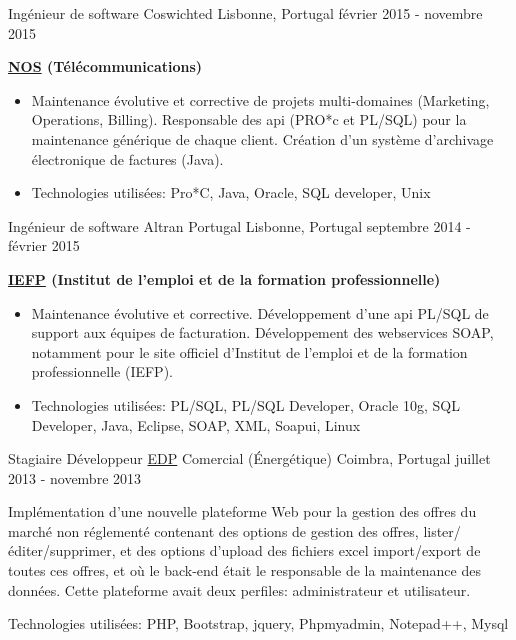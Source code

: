 \begin{cventries}

\cventry
{Ingénieur de software} %
{Coswichted} %
{Lisbonne, Portugal} %
{février 2015 - novembre 2015} %
{ %
\begin{cvitems}
\item { \textbf{\href{https://www.nos.pt/}{NOS} (Télécommunications)}}
\begin{itemize}
\item {Maintenance évolutive et corrective de projets multi-domaines (Marketing, Operations, Billing). 
Responsable des api (PRO*c et PL/SQL) pour la maintenance générique de chaque client. Création d’un système d’archivage électronique de factures (Java).}
\item {Technologies utilisées: Pro*C, Java, Oracle, SQL developer, Unix}
\end{itemize}
\end{cvitems}
}


\cventry
{Ingénieur de software} %
{Altran Portugal} %
{Lisbonne, Portugal} %
{septembre 2014 - février 2015} %
{ %
\begin{cvitems}
\item { \textbf{\href{https://www.iefp.pt/}{IEFP} (Institut de l'emploi et de la formation professionnelle)}}
\begin{itemize}
\item {Maintenance évolutive et corrective. Développement d’une api PL/SQL de support aux équipes de facturation. Développement des webservices SOAP, notamment pour le site officiel d’Institut de l'emploi et de la formation professionnelle (IEFP).}
\item{Technologies utilisées: PL/SQL, PL/SQL Developer, Oracle 10g, SQL Developer, Java, Eclipse, SOAP, XML, Soapui, Linux}
\end{itemize}
\end{cvitems} 
}


\cventry
{Stagiaire Développeur} %
{\href{http://www.edp.pt/pt/Pages/homepage.aspx}{EDP} Comercial (Énergétique)} %
{Coimbra, Portugal} %
{juillet 2013 - novembre 2013} %
{ %
\begin{cvitems}
\item {Implémentation d’une nouvelle plateforme Web pour la gestion des offres du marché non réglementé contenant des options de gestion des offres, lister/éditer/supprimer, et des options d’upload des fichiers excel import/export de toutes ces offres, et où le back-end  était le responsable de la maintenance des données. Cette plateforme avait deux perfiles: administrateur et utilisateur.}
\item{Technologies utilisées: PHP, Bootstrap, jquery, Phpmyadmin, Notepad++, Mysql}
\end{cvitems}
}


\end{cventries}
